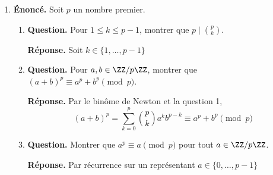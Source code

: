 \documentclass[12pt, a4paper]{article}
\begin{document}
\begin{enumerate}[label=2.\arabic*., start=17]
\begin{minipage}[t]{\linewidth}
\begin{enumerate}[\arabic*.]
  \item \textbf{Question.} $A$ est-il un corps pour les lois usuelles ?
\par\smallskip
\textbf{Réponse.} $N(2) = 4 \notin \{1,-1\}$, donc $2 \neq 0$ n'est pas inversible dans $A$.

        $\therefore A$ n'est pas un corps

\end{enumerate}
\end{minipage}

  \item \begin{minipage}[t]{\linewidth}\raggedright
\textbf{Énoncé.} Soit $p$ un nombre premier.

\begin{enumerate}[\arabic*.]
        \item \textbf{Question.} Pour $1\leq k\leq p-1$, montrer que $p\mid\binom pk$.
\par\smallskip
\textbf{Réponse.} Soit $k \in \{1,\ldots,p-1\}$

  \item \textbf{Question.} Pour $a,b\in\ZZ/p\ZZ$, montrer que $(a+b)^p\equiv a^p+b^p\pmod p$.
\par\smallskip
\textbf{Réponse.} Par le binôme de Newton et la question 1,
        \[
          (a+b)^p = \sum_{k=0}^p \binom pk a^kb^{p-k}
          \equiv a^p + b^p \pmod p
        \]

  \item \textbf{Question.} Montrer que $a^p\equiv a\pmod p$ pour tout $a\in\ZZ/p\ZZ$.
\par\smallskip
\textbf{Réponse.} Par récurrence sur un représentant $a \in \{0,\ldots,p-1\}$


\end{enumerate}
\end{minipage}
\end{enumerate}
\end{document}
